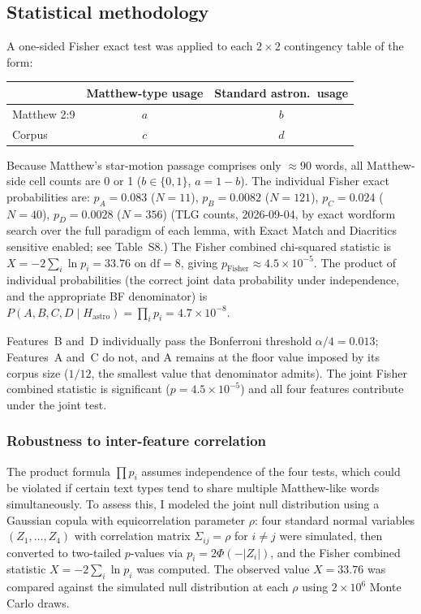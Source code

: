 \documentclass[11pt,a4paper]{article}
\begin{document}
\subsection{Statistical methodology}

A one-sided Fisher exact test was applied to each $2\times2$ contingency
table of the form:

\begin{center}
\begin{tabular}{@{}lcc@{}}
\toprule
 & Matthew-type usage & Standard astron.\ usage \\
\midrule
Matthew 2:9 & $a$ & $b$ \\
Corpus & $c$ & $d$ \\
\bottomrule
\end{tabular}
\end{center}

Because Matthew's star-motion passage comprises only $\approx\!90$ words,
all Matthew-side cell counts are 0 or 1 ($b \in \{0,1\}$, $a = 1-b$).
The individual Fisher exact probabilities are:
$p_A = 0.083$ ($N=11$), $p_B = 0.0082$ ($N=121$), $p_C = 0.024$ ($N=40$),
$p_D = 0.0028$ ($N=356$)
(TLG counts, 2026-09-04, by exact wordform search over the full paradigm of
each lemma, with \textsf{Exact Match} and \textsf{Diacritics sensitive}
enabled; see Table~S8.)
The Fisher combined chi-squared statistic is
$X = -2\sum_i \ln p_i = 33.76$ on $\mathrm{df}=8$, giving
$p_\text{Fisher} \approx 4.5\times10^{-5}$.
The product of individual probabilities (the correct joint data probability
under independence, and the appropriate BF denominator) is
$P(A,B,C,D \mid H_\text{astro}) = \prod_i p_i = 4.7\times10^{-8}$.

Features~B and~D individually pass the Bonferroni threshold
$\alpha/4 = 0.013$; Features~A and~C do not, and A remains at the floor value
imposed by its corpus size ($1/12$, the smallest value that denominator
admits). The joint Fisher combined statistic is significant
($p = 4.5\times10^{-5}$) and all four features contribute under the joint
test.

\subsubsection*{Robustness to inter-feature correlation}

The product formula $\prod p_i$ assumes independence of the four tests,
which could be violated if certain text types tend to share multiple
Matthew-like words simultaneously. To assess this, I modeled the joint
null distribution using a Gaussian copula with equicorrelation
parameter $\rho$: four standard normal variables $(Z_1,\ldots,Z_4)$
with correlation matrix $\Sigma_{ij} = \rho$ for $i\neq j$ were
simulated, then converted to two-tailed $p$-values via
$p_i = 2\Phi(-|Z_i|)$, and the Fisher combined statistic
$X = -2\sum_i \ln p_i$ was computed. The observed value $X = 33.76$
was compared against the simulated null distribution at each
$\rho$ using $2\times10^6$ Monte Carlo draws.
\end{document}
